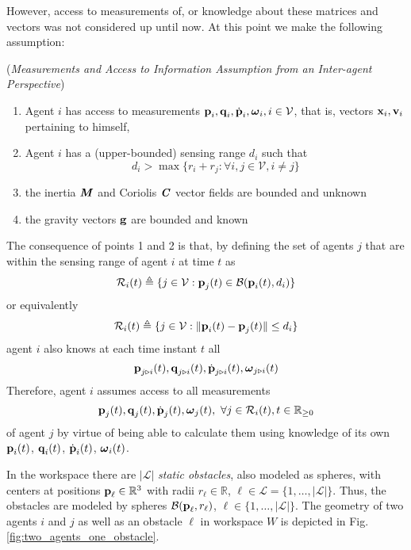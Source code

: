 However, access to measurements of, or knowledge about these matrices and
vectors was not considered up until now. At this point we make the following
assumption:

\begin{gg_box}
  \begin{assumption} (\textit{Measurements and Access to Information Assumption
    from an Inter-agent Perspective})
  \begin{enumerate}

    \item Agent $i$ has access to measurements
      $\bm{\mathbf{p}}_i, \bm{\mathbf{q}}_i, \dot{\bm{\mathbf{p}}}_i, \bm{\mathbf{\omega}}_i, i\in\mathcal{V}$,
      that is, vectors $\bm{\mathbf{x}}_i, \bm{\mathbf{v}}_i$ pertaining to himself,

    \item Agent $i$ has a (upper-bounded) sensing range $d_i$ such that
      $$d_i > \max\{r_i + r_j : \forall i,j \in \mathcal{V}, i \neq j\}$$

    \item the inertia $\bm{\mathit{M}}$ and Coriolis $\bm{\mathit{C}}$ vector fields are
      bounded and unknown

    \item the gravity vectors $\bm{\mathbf{g}}$ are bounded and known

  \end{enumerate}
  \label{ass:measurements_access}
\end{assumption}
\end{gg_box}

The consequence of points 1 and 2 is that, by defining the set of
agents $j$ that are within the sensing range of agent $i$ at time $t$ as
$$\mathcal{R}_i(t) \triangleq \{j\in\mathcal{V} : \bm{\mathbf{p}}_j(t)\in\mathcal{B}(\bm{\mathbf{p}}_i(t), d_i)\}$$
or equivalently
$$\mathcal{R}_i(t) \triangleq \{j\in\mathcal{V} : \| \bm{\mathbf{p}}_i(t) - \bm{\mathbf{p}}_j(t) \| \leq d_i\}$$
agent $i$ also knows at each time instant $t$ all
$$\bm{\mathbf{p}}_{j \triangleright i}(t), \bm{\mathbf{q}}_{j \triangleright i}(t),
\dot{\bm{\mathbf{p}}}_{j \triangleright i}(t), \bm{\mathbf{\omega}}_{j \triangleright i}(t)$$
Therefore, agent $i$ assumes access to all measurements
$$\bm{\mathbf{p}}_{j}(t), \bm{\mathbf{q}}_{j}(t), \dot{\bm{\mathbf{p}}}_j(t),
\bm{\mathbf{\omega}}_j(t),\ \forall j\in \mathcal{R}_i(t),t\in\mathbb{R}_{\geq 0}$$
of agent $j$ by virtue of being able to calculate them using knowledge of its own
$\bm{\mathbf{p}}_i(t)$, $\bm{\mathbf{q}}_i(t)$, $\dot{\bm{\mathbf{p}}}_i(t)$, $\bm{\mathbf{\omega}}_i(t)$.


In the workspace there are $|\mathcal{L}|$ \textit{static obstacles},
also modeled as spheres, with centers at positions
$\bm{\mathbf{p}}_{\ell} \in \mathbb{R}^3$ with radii
$r_{\ell}\in \mathbb{R}$, $\ell \in \mathcal{L} = \{1,\dots,|\mathcal{L}| \}$.
Thus, the obstacles are modeled by spheres
$\mathcal{B}(\bm{\mathbf{p}}_{\ell}, r_{\ell})$, $\ell \in \{1,\dots,|\mathcal{L}|\}$.
The geometry of two agents $i$ and $j$ as well as an obstacle
$\ell$ in workspace $W$ is depicted in Fig. \ref{fig:two_agents_one_obstacle}.\\

